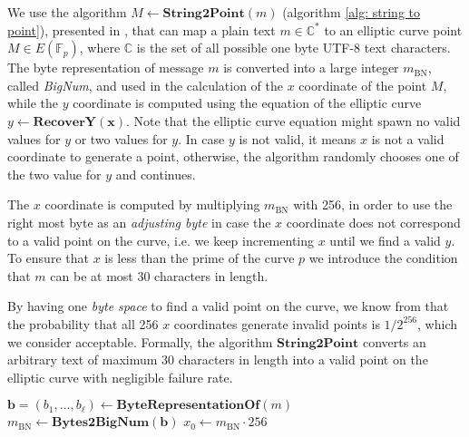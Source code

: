 We use the algorithm \( M \gets \mathbf{String2Point}(m) \) (algorithm \ref{alg: string to point}), presented in \cite{Trappe05}, that can map a plain text \( m \in \mathbb{C}^* \) to an elliptic curve point \( M \in E(\mathbb{F}_p) \), where $\mathbb{C}$ is the set of all possible one byte UTF-8 text characters. The byte representation of message $m$ is converted into a large integer $m_\mathrm{BN}$, called \textit{BigNum}, and used in the calculation of the $x$ coordinate of the point $M$, while the $y$ coordinate is computed using the equation of the elliptic curve \( y \gets \mathbf{RecoverY(x)} \). Note that the elliptic curve equation might spawn no valid values for $y$ or two values for $y$. In case $y$ is not valid, it means $x$ is not a valid coordinate to generate a point, otherwise, the algorithm randomly chooses one of the two value for $y$ and continues.

The $x$ coordinate is computed by multiplying $m_\mathrm{BN}$ with 256, in order to use the right most byte as an \textit{adjusting byte} in case the $x$ coordinate does not correspond to a valid point on the curve, i.e. we keep incrementing $x$ until we find a valid $y$. To ensure that $x$ is less than the prime of the curve $p$ we introduce the condition that $m$ can be at most 30 characters in length.

By having one \textit{byte space} to find a valid point on the curve, we know from \cite{Trappe05} that the probability that all 256 $x$ coordinates generate invalid points is $1/2^{256}$, which we consider acceptable. Formally, the algorithm $\mathbf{String2Point}$ converts an arbitrary text of maximum 30 characters in length into a valid point on the elliptic curve with negligible failure rate.

\begin{algorithm}[!h]
\DontPrintSemicolon
    \caption{\( \mathbf{String2Point} (m) \)}
    \( \boldsymbol{b} = (b_1, ..., b_\ell) \gets \mathbf{ByteRepresentationOf} (m) \) \;
    \( m_\mathrm{BN} \gets \mathbf{Bytes2BigNum} (\boldsymbol{b}) \) \;
    \( x_0 \gets m_\mathrm{BN} \cdot 256 \) \;
\end{algorithm}

